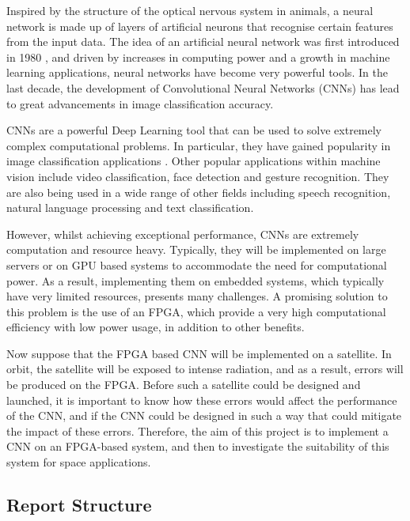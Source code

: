 \documentclass[12pt]{article}
\begin{document}
Inspired by the structure of the optical nervous system in animals, a neural network is made up of layers of artificial neurons that recognise certain features from the input data. The idea of an artificial neural network was first introduced in 1980 \cite{neocognitron}, and driven by increases in computing power and a growth in machine learning applications, neural networks have become very powerful tools. In the last decade, the development of Convolutional Neural Networks (CNNs) has lead to great advancements in image classification accuracy.

CNNs are a powerful Deep Learning tool that can be used to solve extremely complex computational problems. In particular, they have gained popularity in image classification applications \cite{ImageNetChallenge}. Other popular applications within machine vision include video classification, face detection and gesture recognition. They are also being used in a wide range of other fields including speech recognition, natural language processing and text classification.

However, whilst achieving exceptional performance, CNNs are extremely computation and resource heavy. Typically, they will be implemented on large servers or on GPU based systems to accommodate the need for computational power. As a result, implementing them on embedded systems, which typically have very limited resources, presents many challenges. A promising solution to this problem is the use of an FPGA, which provide a very high computational efficiency with low power usage, in addition to other benefits.

Now suppose that the FPGA based CNN will be implemented on a satellite. In orbit, the satellite will be exposed to intense radiation, and as a result, errors will be produced on the FPGA. Before such a satellite could be designed and launched, it is important to know how these errors would affect the performance of the CNN, and if the CNN could be designed in such a way that could mitigate the impact of these errors. Therefore, the aim of this project is to implement a CNN on an FPGA-based system, and then to investigate the suitability of this system for space applications.

\vspace{-12pt}
\subsection{Report Structure}
\label{sec:Intro-Structure}
\vspace{-12pt}
\end{document}
